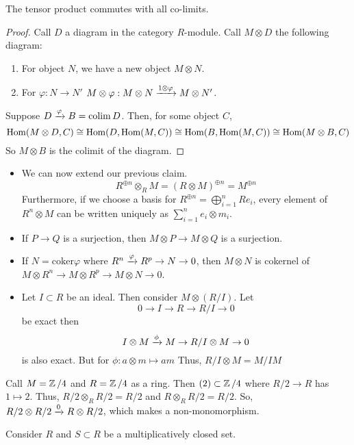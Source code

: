 \begin{theorem}
    The tensor product commutes with all co-limits.
    \begin{proof}
        Call $D$ a diagram in the category $R$-module. Call $M \otimes D$
        the following diagram:
        \begin{enumerate}
            \item For object $N$, we have a new object $M \otimes N$.
            \item For $\varphi: N \to N'$ $M \otimes \varphi: M \otimes N \xrightarrow{1 \otimes \varphi} M \otimes N'$.
        \end{enumerate}
        Suppose $D \xrightarrow{\varphi} B = \operatorname{colim} D$.
        Then, for some object $C$,
        \[ \operatorname{Hom}(M \otimes D, C) \cong \operatorname{Hom}(D, \operatorname{Hom}(M, C)) \cong \operatorname{Hom}(B, \operatorname{Hom}(M, C)) \cong \operatorname{Hom}(M \otimes B, C)\]
        So $M \otimes B$ is the colimit of the diagram.
    \end{proof}
\end{theorem}
\begin{example}
    \begin{itemize}
    \item We can now extend our previous claim.
    \[ R^{\oplus n} \otimes_R M = (R \otimes M)^{\oplus n} = M^{\oplus n}\]
    Furthermore, if we choose a basis for $R^{\oplus n} = \bigoplus_{i=1}^n Re_i$, every element of $R^n \otimes M$
    can be written uniquely as $\sum_{i=1}^n e_i \otimes m_i$.
    \item If $P \to Q$ is a surjection, then $M \otimes P \to M \otimes Q$ is a surjection.
    \item If $N = \textrm{coker} \varphi$ where $R^n \xrightarrow{\varphi} R^p \to N \to 0$,
    then $M \otimes N$ is cokernel of $M \otimes R^n \to M \otimes R^p \to M \otimes N \to 0$.
    \item Let $I \subset R$ be an ideal. Then consider $M \otimes (R/I)$.
    Let
    \[ 0 \to I \to R \to R/I \to 0 \]
    be exact
    then
    \[ I \otimes M \xrightarrow{\phi} M \to R/I \otimes M \to 0 \]
    is also exact. But for $\phi: a \otimes m \mapsto am$
    Thus, $R/I \otimes M = M/IM$
    \end{itemize}
    \item Call $M = \operatorname{\mathbb{Z}}/4$ and $R = \operatorname{\mathbb{Z}}/4$ as a ring.
    Then $(2) \subset \operatorname{\mathbb{Z}}/4$ where $R/2 \to R$ has $1 \mapsto 2$.
    Thus, $R/2 \otimes_R R/2 = R/2$ and $R \otimes_R R/2 = R/2$.
    So, $R/2 \otimes R/2 \xrightarrow{0} R \otimes R/2$, which makes a non-monomorphism.
\end{example}
Consider $R$ and $S \subset R$ be a multiplicatively closed set.
